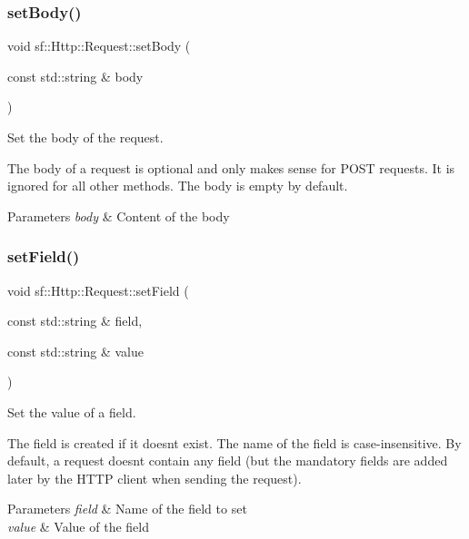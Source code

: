 \subsubsection{\texorpdfstring{set\+Body()}{setBody()}}
{\footnotesize\ttfamily void sf\+::\+Http\+::\+Request\+::set\+Body (\begin{DoxyParamCaption}\item[{const std\+::string \&}]{body }\end{DoxyParamCaption})}



Set the body of the request. 

The body of a request is optional and only makes sense for P\+O\+ST requests. It is ignored for all other methods. The body is empty by default.


\begin{DoxyParams}{Parameters}
{\em body} & Content of the body \\
\hline
\end{DoxyParams}
\mbox{\label{classsf_1_1_http_1_1_request_aea672fae5dd089f4b6b3745ed46210d2}} 
\subsubsection{\texorpdfstring{set\+Field()}{setField()}}
{\footnotesize\ttfamily void sf\+::\+Http\+::\+Request\+::set\+Field (\begin{DoxyParamCaption}\item[{const std\+::string \&}]{field,  }\item[{const std\+::string \&}]{value }\end{DoxyParamCaption})}



Set the value of a field. 

The field is created if it doesn\textquotesingle{}t exist. The name of the field is case-\/insensitive. By default, a request doesn\textquotesingle{}t contain any field (but the mandatory fields are added later by the H\+T\+TP client when sending the request).


\begin{DoxyParams}{Parameters}
{\em field} & Name of the field to set \\
\hline
{\em value} & Value of the field \\
\hline
\end{DoxyParams}
\mbox{\label{classsf_1_1_http_1_1_request_aa683b607b737a6224a91387b4108d3c7}} 
